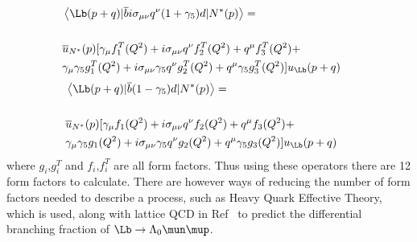 \begin{equation}
\hspace*{-0.5cm}
\begin{split}
&\left<\Lb(p+q)|\overline{b}i\sigma_{\mu\nu}q^{\nu}(1+\gamma_{5})d|N^{*}(p)\right> = \\&\\&\overline{u}_{N^{*}}(p)[\gamma_{\mu}f^{T}_{1}(Q^{2}) + i\sigma_{\mu\nu}q^{\nu}f^{T}_{2}(Q^{2}) + q^{\mu}f^{T}_{3}(Q^{2}) + \\
&\gamma_{\mu}\gamma_{5}g^{T}_{1}(Q^{2}) + i\sigma_{\mu\nu}\gamma_{5}q^{\nu}g^{T}_{2}(Q^{2}) + q^{\mu}\gamma_{5}g^{T}_{3}(Q^{2})]u_{\Lb}(p+q)
\end{split}
\end{equation}
\begin{equation}
\hspace*{-0.5cm}
\begin{split}
&\left<\Lb(p+q)|\overline{b}(1-\gamma_{5})d|N^{*}(p)\right> = \\&\\&\overline{u}_{N^{*}}(p)[\gamma_{\mu}f_{1}(Q^{2}) + i\sigma_{\mu\nu}q^{\nu}f_{2}(Q^{2}) + q^{\mu}f_{3}(Q^{2}) + \\
&\gamma_{\mu}\gamma_{5}g_{1}(Q^{2}) + i\sigma_{\mu\nu}\gamma_{5}q^{\nu}g_{2}(Q^{2}) + q^{\mu}\gamma_{5}g_{3}(Q^{2})]u_{\Lb}(p+q)\\
\end{split}
\end{equation}
where $g_{i}$,$g^{T}_{i}$ and $f_{i}$,$f^{T}_{i}$ are all form factors. Thus using these operators there are 12 form factors to calculate. There are however ways of reducing the number of form factors needed to describe a process, such as Heavy Quark Effective Theory, which is used, along with lattice QCD in Ref~\cite{Meinel} to predict the differential branching fraction of $\Lb\to\Lambda_{0}\mun\mup$.
